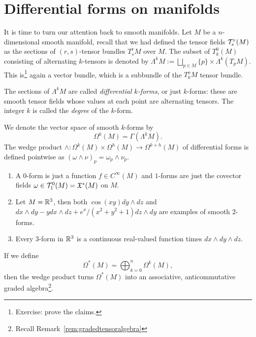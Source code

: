 \section{Differential forms on manifolds}

It is time to turn our attention back to smooth manifolds.
Let $M$ be a $n$-dimensional smooth manifold, recall that we had defined the tensor fields $\mathcal{T}_s^r(M)$ as the sections of $(r,s)$-tensor bundles $T_s^rM$ over $M$.
The subset of $T_k^0(M)$ consisting of alternating $k$-tensors is denoted by $\Lambda^kM:= \bigsqcup_{p\in M} \{p\}\times \Lambda^k(T_p M)$. This is\footnote{Exercise: prove the claims.} again a vector bundle, which is a subbundle of the $T_k^o M$ tensor bundle.
\begin{definition}
	The sections of $\Lambda^kM$ are called \emph{differential $k$-forms}, or just $k$-forms: these are smooth tensor fields whose values at each point are alternating tensors. The integer $k$ is called the \emph{degree} of the $k$-form.

	We denote the vector space of smooth $k$-forms by
	\begin{equation}
		\Omega^k(M) = \Gamma(\Lambda^kM).
	\end{equation}
	The wedge product $\wedge:\Omega^k(M)\times\Omega^h(M)\to \Omega^{k+h}(M)$ of differential forms is defined pointwise as ${(\omega\wedge\nu)}_p = \omega_p\wedge\nu_p$.
\end{definition}

\begin{example}
	\begin{enumerate}
		\item A $0$-form is just a function $f\in C^\infty(M)$ and $1$-forms are just the covector fields $\omega\in\mathcal{T}_1^0(M) = \mathfrak{X}^*(M)$ on $M$.
		\item Let $M=\mathbb{R}^3$, then both $\cos(xy)dy\wedge dz$ and $dx\wedge dy - y dx\wedge dz + e^x/(x^2+y^2+1) dz\wedge dy$ are examples of smooth $2$-forms.
		\item Every $3$-form in $\mathbb{R}^3$ is a continuous real-valued function times $dx\wedge dy\wedge dz$.
	\end{enumerate}
\end{example}

\begin{remark}
	If we define
	\begin{equation}
		\Omega^*(M) = \bigoplus_{k=0}^n \Omega^k(M),
	\end{equation}
	then the wedge product turns $\Omega^*(M)$ into an associative, anticommutative graded algebra\footnote{Recall Remark~\ref{rem:gradedtensoralgebra}}.
\end{remark}

